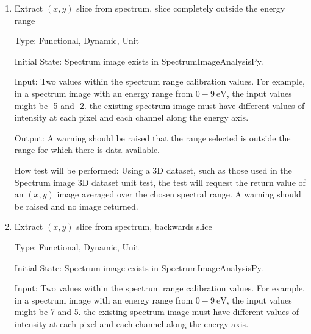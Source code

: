 \documentclass[12pt, titlepage]{article}
\newcommand{\progname}{SpectrumImageAnalysisPy}
\begin{document}
\begin{enumerate}
Type: Functional, Dynamic, Unit

Initial State: Spectrum image exists in \progname{}.

Input: Two values within the spectrum range calibration values. For example, in a spectrum image with an energy range from $0-9\ \si{\electronvolt}$, the input values might be 5 and 12. the existing spectrum image must have different values of intensity at each pixel and each channel along the energy axis.

Output: An $(x,y)$ image averaged over the spectral range specified by the input to the test and the maximum value of the energy range in the spectrum image.

How test will be performed: Using a 3D dataset, such as those used in the Spectrum image 3D dataset unit test, the test will request the return value of an $(x,y)$ image averaged over the chosen spectral range. No errors should be raised. Check that the range averaged over is the same as the range selected within the data limits.


\item{Extract $(x,y)$ slice from spectrum, slice completely outside the energy range}

Type: Functional, Dynamic, Unit

Initial State: Spectrum image exists in \progname{}.

Input: Two values within the spectrum range calibration values. For example, in a spectrum image with an energy range from $0-9\ \si{\electronvolt}$, the input values might be -5 and -2. the existing spectrum image must have different values of intensity at each pixel and each channel along the energy axis.

Output: A warning should be raised that the range selected is outside the range for which there is data available.

How test will be performed: Using a 3D dataset, such as those used in the Spectrum image 3D dataset unit test, the test will request the return value of an $(x,y)$ image averaged over the chosen spectral range. A warning should be raised and no image returned.


\item{Extract $(x,y)$ slice from spectrum, backwards slice}

Type: Functional, Dynamic, Unit

Initial State: Spectrum image exists in \progname{}.

Input: Two values within the spectrum range calibration values. For example, in a spectrum image with an energy range from $0-9\ \si{\electronvolt}$, the input values might be 7 and 5. the existing spectrum image must have different values of intensity at each pixel and each channel along the energy axis.


\end{enumerate}
\end{document}
